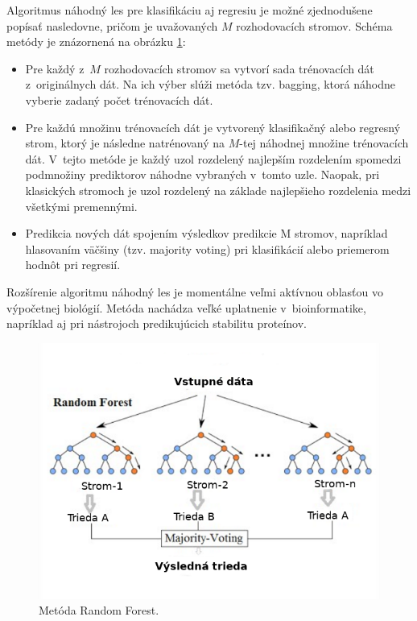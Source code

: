 Algoritmus náhodný les pre klasifikáciu aj regresiu je možné zjednodušene popísať nasledovne, pričom je uvažovaných $M$ rozhodovacích stromov. Schéma metódy je znázornená na obrázku \ref{random_forest}:
\begin{itemize}
	\item Pre každý z~$M$ rozhodovacích stromov sa vytvorí sada trénovacích dát z~originálnych dát. Na ich výber slúži metóda tzv. bagging, ktorá náhodne vyberie zadaný počet trénovacích dát.
	\item Pre každú množinu trénovacích dát je vytvorený klasifikačný alebo regresný strom, ktorý je následne natrénovaný na $M$-tej náhodnej množine trénovacích dát. V~tejto metóde je každý uzol rozdelený najlepším rozdelením spomedzi podmnožiny prediktorov náhodne vybraných v~tomto uzle. Naopak, pri klasických stromoch je uzol rozdelený na základe najlepšieho rozdelenia medzi všetkými premennými.
	\item Predikcia nových dát spojením výsledkov predikcie M stromov, napríklad hlasovaním väčšiny (tzv. majority voting) pri klasifikácií alebo priemerom hodnôt pri regresií.
\end{itemize}

Rozšírenie algoritmu náhodný les je momentálne veľmi aktívnou oblasťou vo výpočetnej biológií. Metóda nachádza veľké uplatnenie v~bioinformatike, napríklad aj pri nástrojoch predikujúcich stabilitu proteínov.

\begin{figure}[H]
	\centering
	\begin{center}
		\scalebox{0.8}
		{   
			\includegraphics{rf.png}
			
		}
		\caption[Random Forest]{Metóda Random Forest\footnotemark.}
		\label{random_forest}
	\end{center}
\end{figure}

